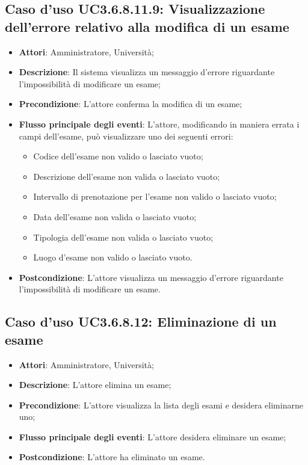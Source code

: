 \subsection{Caso d'uso \texorpdfstring{UC3.6.8.11.9}{UC3.6.8.11.9}: Visualizzazione dell'errore relativo alla modifica di un esame}
\begin{itemize}
\item \textbf{Attori}: Amministratore, Università;
\item \textbf{Descrizione}: Il sistema visualizza un messaggio d'errore riguardante l'impossibilità di modificare un esame;

\item \textbf{Precondizione}: L'attore conferma la modifica di un esame;

\item \textbf{Flusso principale degli eventi}: L'attore, modificando in maniera errata i campi dell'esame, può visualizzare uno dei seguenti errori: \begin{itemize} 
\item Codice dell’esame non valido o lasciato vuoto; 
\item Descrizione dell’esame non valida o lasciato vuoto; 
\item Intervallo di prenotazione per l’esame non valido o lasciato vuoto; 
\item Data dell’esame non valida o lasciato vuoto; 
\item Tipologia dell’esame non valida o lasciato vuoto; 
\item Luogo d’esame non valido o lasciato vuoto.
\end{itemize}
\item \textbf{Postcondizione}: L'attore visualizza un messaggio d'errore riguardante l'impossibilità di modificare un esame.

\end{itemize}
\subsection{Caso d'uso \texorpdfstring{UC3.6.8.12}{UC3.6.8.12}: Eliminazione di un esame}
\begin{itemize}
\item \textbf{Attori}: Amministratore, Università;
\item \textbf{Descrizione}: L'attore elimina un esame;

\item \textbf{Precondizione}: L'attore visualizza la lista degli esami e desidera eliminarne uno;

\item \textbf{Flusso principale degli eventi}: L'attore desidera eliminare un esame;

\item \textbf{Postcondizione}: L'attore ha eliminato un esame.

\end{itemize}
